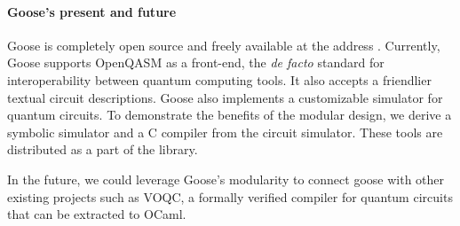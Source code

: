 \documentclass[a4paper]{easychair}
\begin{document}
\paragraph*{Goose's present and future} Goose is completely open source and freely available at the address \url{}.
Currently, Goose supports OpenQASM as a front-end, the \textit{de facto} standard for interoperability between quantum computing tools. It also accepts a friendlier textual circuit descriptions. Goose also implements a customizable simulator for quantum circuits. To demonstrate the benefits of the modular design, we derive a symbolic simulator and a C compiler from the circuit simulator. These tools are distributed as a part of the library.

In the future, we could leverage Goose's modularity to connect goose with other existing projects such as VOQC, a formally verified compiler for quantum circuits that can be extracted to OCaml.





\end{document}
